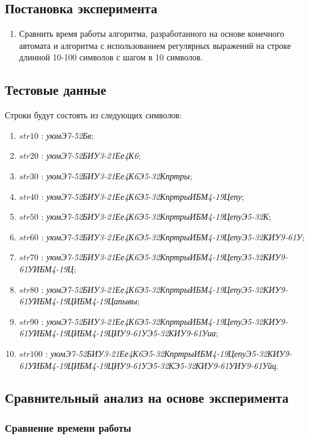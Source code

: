 \documentclass[a4paper,12pt]{article}
\begin{document}
\subsection{Постановка эксперимента}

\begin{enumerate}
	\item Сравнить время работы алгоритма, разработанного на основе конечного автомата и алгоритма с использованием регулярных выражений на строке длинной 10-100 символов с шагом в 10 символов.
\end{enumerate}

\subsection{Тестовые данные}

Строки будут состоять из следующих символов:
\begin{enumerate}
	\item $str10$ : \textit{уюмЭ7-52Бв};
	\item $str20$ : \textit{уюмЭ7-52БИУ3-21Ее4К6};
	\item $str30$ : \textit{уюмЭ7-52БИУ3-21Ее4К6Э5-32Кпртры};
	\item $str40$ : \textit{уюмЭ7-52БИУ3-21Ее4К6Э5-32КпртрыИБМ4-19Цепу};
	\item $str50$ : \textit{уюмЭ7-52БИУ3-21Ее4К6Э5-32КпртрыИБМ4-19ЦепуЭ5-32К};
	\item $str60$ : \textit{уюмЭ7-52БИУ3-21Ее4К6Э5-32КпртрыИБМ4-19ЦепуЭ5-32КИУ9-61У};
	\item $str70$ : \textit{уюмЭ7-52БИУ3-21Ее4К6Э5-32КпртрыИБМ4-19ЦепуЭ5-32КИУ9-61УИБМ4-19Ц};
	\item $str80$ : \textit{уюмЭ7-52БИУ3-21Ее4К6Э5-32КпртрыИБМ4-19ЦепуЭ5-32КИУ9-61УИБМ4-19ЦИБМ4-19Цапывы};
	\item $str90$ : \textit{уюмЭ7-52БИУ3-21Ее4К6Э5-32КпртрыИБМ4-19ЦепуЭ5-32КИУ9-61УИБМ4-19ЦИБМ4-19ЦИУ9-61УЭ5-32КИУ9-61Уиа};
	\item $str100$ : \textit{уюмЭ7-52БИУ3-21Ее4К6Э5-32КпртрыИБМ4-19ЦепуЭ5-32КИУ9-61УИБМ4-19ЦИБМ4-19ЦИУ9-61УЭ5-32КЭ5-32КИУ9-61УИУ9-61Уйц}.
\end{enumerate}


\subsection{Сравнительный анализ на основе эксперимента}

\subsubsection{Сравнение времени работы}
\end{document}
